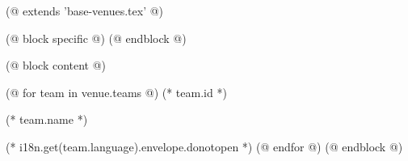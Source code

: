 (@ extends 'base-venues.tex' @)

(@ block specific @)
    \geometry{paper=c5paper, landscape}
(@ endblock @)

(@ block content @)
    \pagestyle{empty}
    \centering

    (@ for team in venue.teams @)
        \vspace*{10mm}
        \fontsize{120}{0}\selectfont
        (* team.id *)

        \vspace{10mm}
        \fontsize{15}{0}\selectfont
        (* team.name *)

        \vspace{30mm}
        \normalsize
        (* i18n.get(team.language).envelope.donotopen *)
        \newpage
    (@ endfor @)
(@ endblock @)
